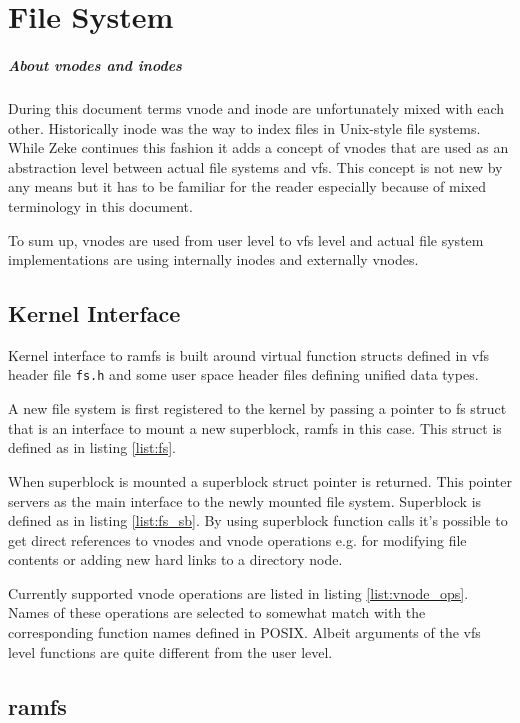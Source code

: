 \part{File System}

\subsubsection{About vnodes and inodes}

During this document terms \acs{vnode} and \acs{inode} are unfortunately mixed
with each other. Historically inode was the way to index files in Unix-style
file systems.\cite{Wikipedia:inode} While Zeke continues this fashion it adds
a concept of vnodes that are used as an abstraction level between actual file
systems and \acf{vfs}. This concept is not new by any means but it has to be
familiar for the reader especially because of mixed terminology in this
document.

To sum up, vnodes are used from user level to \acs{vfs} level and actual file
system implementations are using internally inodes and externally vnodes.

\chapter{Kernel Interface}

Kernel interface to ramfs is built around virtual function structs defined in
\acs{vfs} header file \verb+fs.h+ and some user space header files defining
unified data types.

A new file system is first registered to the kernel by passing a pointer to
fs struct that is an interface to mount a new superblock, ramfs in this case.
This struct is defined as in listing \ref{list:fs}.

When superblock is mounted a superblock struct pointer is returned. This pointer
servers as the main interface to the newly mounted file system. Superblock is
defined as in listing \ref{list:fs_sb}. By using superblock function calls it's
possible to get direct references to vnodes and \acs{vnode} operations e.g. for
modifying file contents or adding new hard links to a directory node.




Currently supported vnode operations are listed in listing \ref{list:vnode_ops}.
Names of these operations are selected to somewhat match with the corresponding
function names defined in \acs{POSIX}. Albeit arguments of the \acs{vfs} level
functions are quite different from the user level.



\chapter{ramfs}
